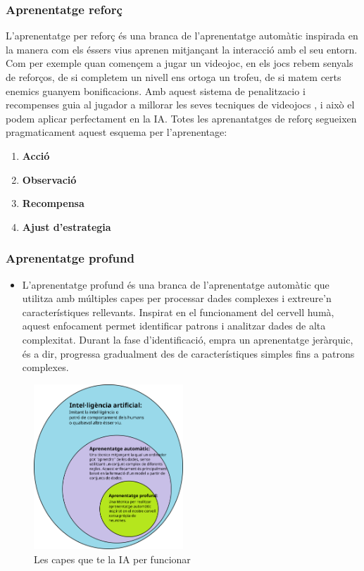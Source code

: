 \subsubsection{Aprenentatge reforç}\label{subsubsec:Aprenentatge reforç}
L'aprenentatge per reforç és una branca de l'aprenentatge automàtic inspirada en la manera com els éssers vius aprenen mitjançant la interacció amb el seu entorn. Com per exemple quan començem a jugar un videojoc, en els jocs rebem senyals de reforços, de si completem un nivell ens ortoga un trofeu, de si matem certs enemics guanyem bonificacions. Amb aquest sistema de penalitzacio i recompenses guia al jugador a millorar les seves tecniques de videojocs , i això  el podem aplicar perfectament en la IA.
Totes les aprenantatges de reforç segueixen pragmaticament aquest esquema per l'aprenentage:
\begin{enumerate}
 \item \textbf{Acció}
 \item \textbf{Observació}
 \item \textbf{Recompensa}
 \item \textbf{Ajust d'estrategia}
\end{enumerate}


\subsubsection{Aprenentatge profund}
\begin{itemize}
    \item L'aprenentatge profund és una branca de l'aprenentatge automàtic que utilitza  amb múltiples capes per processar dades complexes i extreure'n característiques rellevants. Inspirat en el funcionament del cervell humà, aquest enfocament permet identificar patrons i analitzar dades de alta complexitat. Durant la fase d'identificació, empra un aprenentatge jeràrquic, és a dir, progressa gradualment des de característiques simples fins a patrons complexes.
\end{itemize}



\begin{figure}[h!]
    \centering
    \includegraphics[width=0.5\textwidth]{./figures/Aprenentatge.png}
    \caption{Les capes que te la IA per funcionar}
\end{figure}


